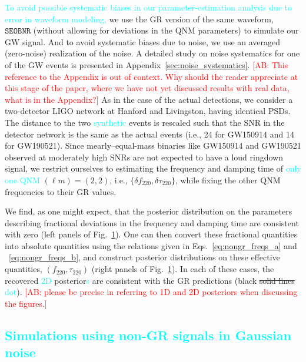 \documentclass[twocolumn,prd,aps,superscriptaddress,preprintnumbers,tightenlines,showpacs,nofootinbib,eqsecnum,amsfonts,amsmath]{revtex4-1}
\newcommand{\ab}[1]{\textcolor{cyan}{#1}}
\newcommand{\comment}[1]{\textcolor{red}{[#1]}}
\newcommand{\df}[1]{\delta f_{\text{#1}}}
\newcommand{\dtau}[1]{\delta \tau_{\text{#1}}}
\newcommand{\fngr}[1]{f_{\text{#1}}}
\newcommand{\taungr}[1]{\tau_{\text{#1}}}
\newcommand{\SEOB}{\texttt{SEOBNR}}
\begin{document}
\begin{figure}[hbt]
\begin{center}
	\label{fig:simulated_signal_GR}
\end{center}
\end{figure}

\ab{To avoid possible systematic biases in our parameter-estimation analysis 
due to error in waveform modeling,} we use the GR version of the same waveform,
$\SEOB$ (without allowing for deviations in the QNM parameters) to
simulate our GW signal. And to avoid systematic biases due to noise,
we use an averaged (zero-noise) realization of the noise. A detailed
study on noise systematics for one of the GW events is presented in
Appendix~\ref{sec:noise_systematics}. \comment{AB: This reference to the Appendix is out of context. 
Why should the reader appreciate at this stage of the paper, where we have not yet 
discussed results with real data, what is in the Appendix?} As in the case of the actual
detections, we consider a two-detector LIGO network at
Hanford and Livingston, having identical PSDs. The distance to the two
\ab{synthetic} events is rescaled such that the SNR in the detector network
is the same as the actual events (i.e., 24 for GW150914 and 14 
for GW190521). Since mearly--equal-mass binaries like GW150914 and
GW190521 observed at moderately high SNRs are not expected to have a
loud ringdown signal, we restrict ourselves to estimating the
frequency and damping time of \ab{only one QNM} $(\ell m) = (2,2)$, i.e.,
$\{\df{220},\dtau{220}\}$, while fixing the other QNM frequencies to
their GR values.

We find, as one might expect, that the posterior distribution on the
parameters describing fractional deviations in the frequency and
damping time are consistent with zero (left panels of
Fig.~\ref{fig:simulated_signal_GR}). One can then convert these
fractional quantities into absolute quantities using the relations
given in Eqs.~\ref{eq:nongr_freqs_a} and ~\ref{eq:nongr_freqs_b}, and
construct posterior distributions on these effective quantities,
$(\fngr{220}, \taungr{220})$ (right panels of
Fig.~\ref{fig:simulated_signal_GR}). In each of these cases, the recovered
\ab{2D} posterior{\ab{s} are consistent with the GR predictions 
(black \sout{solid lines} \ab{dot}). \comment{AB: please be precise in referring 
to 1D and 2D posteriors when discussing the figures.}}


\subsection{\ab{Simulations using non-GR signals in Gaussian noise}} \label{ssec:ngr_signal}
\end{document}
